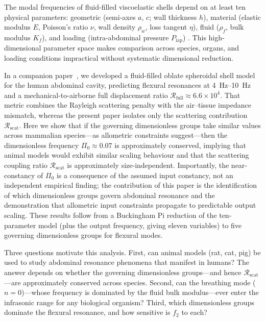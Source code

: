 \documentclass[review]{elsarticle}
\begin{document}
The modal frequencies of fluid-filled viscoelastic shells depend on at
least ten physical parameters: geometric (semi-axes $a$, $c$; wall
thickness $h$), material (elastic modulus $E$, Poisson's ratio $\nu$,
wall density $\rho_w$, loss tangent $\eta$), fluid ($\rho_f$, bulk
modulus $K_f$), and loading (intra-abdominal pressure $P_\mathrm{iap}$)
\cite{Soedel2004,Leissa1973,Junger1986,Junger1952,Lamb1882,Warburton1976}.  This high-dimensional
parameter space makes comparison across species, organs, and loading
conditions impractical without systematic dimensional reduction.

In a companion paper~\cite{Mace2026browntone}, we developed a fluid-filled
oblate spheroidal shell model for the human abdominal cavity, predicting
flexural resonances at \SIrange{4}{10}{\hertz} and a mechanical-to-airborne
full displacement ratio $\mathcal{R}_\mathrm{full} \approx 6.6 \times 10^4$.
That metric combines the Rayleigh scattering penalty with the air--tissue
impedance mismatch, whereas the present paper isolates only the
scattering contribution $\mathcal{R}_\mathrm{scat}$.  Here we show that
if the governing dimensionless groups take similar values across mammalian
species---as allometric constraints suggest---then the dimensionless
frequency $\Pi_0 \approx 0.07$ is approximately conserved, implying that
animal models would exhibit similar scaling behaviour and that the
scattering coupling ratio $\mathcal{R}_\mathrm{scat}$ is
approximately size-independent.  Importantly, the near-constancy of $\Pi_0$
is a consequence of the assumed input constancy, not an independent empirical
finding; the contribution of this paper is the identification of which
dimensionless groups govern abdominal resonance and the demonstration that
allometric input constraints propagate to predictable output scaling.
These results follow from a Buckingham Pi
reduction of the ten-parameter model (plus the output frequency,
giving eleven variables) to five governing dimensionless
groups for flexural modes.

Three questions motivate this analysis.  First, can animal models (rat, cat,
pig) be used to study abdominal resonance phenomena that manifest in humans?
The answer depends on whether the governing dimensionless groups---and hence
$\mathcal{R}_\mathrm{scat}$---are approximately conserved across species.  Second, can the
breathing mode ($n = 0$)---whose frequency is dominated by the fluid bulk
modulus---ever enter the infrasonic range for any biological organism?
Third, which dimensionless groups dominate the flexural resonance, and how
sensitive is $f_2$ to each?
\end{document}
